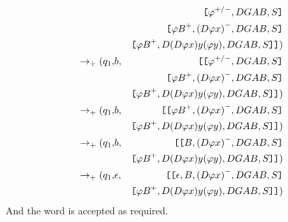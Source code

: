 \begin{example}
\begin{eqnarray}
\nonumber & & \hbox{\tt [}{ \varphi^{+/-}, DGAB,S}\hbox{\tt ]}\\
\nonumber & & \hbox{\tt [}{{\varphi B}^{+},{(D \varphi x)}^{-}, DGAB,S}\hbox{\tt ]}\\
\nonumber & & \hbox{\tt [}{{\varphi B}^{+}, D(D \varphi x) y (\varphi
y), DGAB,S}\hbox{\tt ]}
\hbox{\tt ]})\\
\nonumber \rightarrow_+ (q_1, &b, &  \hbox{\tt[}\hbox{\tt [}{ \varphi^{+/-}, DGAB,S}\hbox{\tt ]}\\
\nonumber & & \hbox{\tt [}{{\varphi B}^{+},{(D \varphi x)}^{-}, DGAB,S}\hbox{\tt ]}\\
\nonumber & & \hbox{\tt [}{{\varphi B}^{+}, D(D \varphi x) y (\varphi
y), DGAB,S}\hbox{\tt ]}
\hbox{\tt ]})\\
\nonumber \rightarrow_+ (q_1, &b, &  \hbox{\tt[}\hbox{\tt [}{{\varphi B}^{+},{(D \varphi x)}^{-}, DGAB,S}\hbox{\tt ]}\\
\nonumber & & \hbox{\tt [}{{\varphi B}^{+}, D(D \varphi x) y (\varphi
y), DGAB,S}\hbox{\tt ]}
\hbox{\tt ]})\\
\nonumber \rightarrow_+ (q_1, &b, &  \hbox{\tt[}\hbox{\tt [}{B,{(D \varphi x)}^{-}, DGAB,S}\hbox{\tt ]}\\
\nonumber & & \hbox{\tt [}{{\varphi B}^{+}, D(D \varphi x) y (\varphi
y), DGAB,S}\hbox{\tt ]}
\hbox{\tt ]})\\
\nonumber \rightarrow_+ (q_1, &\epsilon, &  \hbox{\tt[}\hbox{\tt [}{\epsilon,B,{(D \varphi x)}^{-}, DGAB,S}\hbox{\tt ]}\\
\nonumber & & \hbox{\tt [}{{\varphi B}^{+}, D(D \varphi x) y (\varphi
y), DGAB,S}\hbox{\tt ]} \hbox{\tt ]})
\end{eqnarray}
And the word is accepted as required.
\end{example}
